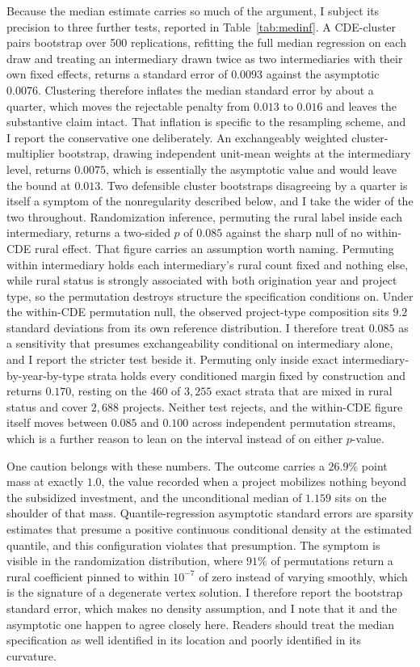 Because the median estimate carries so much of the argument, I subject its
precision to three further tests, reported in
Table~\ref{tab:medinf}. A CDE-cluster pairs bootstrap over 500
replications, refitting the full median regression on each draw and
treating an intermediary drawn twice as two intermediaries with their own
fixed effects, returns a standard error of $0.0093$ against the asymptotic
$0.0076$. Clustering therefore inflates the median standard error by about
a quarter, which moves the rejectable penalty from $0.013$ to $0.016$ and
leaves the substantive claim intact. That inflation is specific to the
resampling scheme, and I report the conservative one deliberately. An
exchangeably weighted cluster-multiplier bootstrap, drawing independent
unit-mean weights at the intermediary level, returns $0.0075$, which is
essentially the asymptotic value and would leave the bound at $0.013$. Two
defensible cluster bootstraps disagreeing by a quarter is itself a symptom
of the nonregularity described below, and I take the wider of the two
throughout. Randomization inference, permuting the
rural label inside each intermediary, returns a two-sided $p$ of $0.085$
against the sharp null of no within-CDE rural effect. That figure carries
an assumption worth naming. Permuting within intermediary holds each
intermediary's rural count fixed and nothing else, while rural status is
strongly associated with both origination year and project type, so the
permutation destroys structure the specification conditions on. Under the
within-CDE permutation null, the observed project-type composition sits
$9.2$ standard deviations from its own reference distribution. I therefore
treat $0.085$ as a sensitivity that presumes exchangeability conditional on
intermediary alone, and I report the stricter test beside it. Permuting
only inside exact intermediary-by-year-by-type strata holds every
conditioned margin fixed by construction and returns $0.170$, resting on
the $460$ of $3{,}255$ exact strata that are mixed in rural status and
cover $2{,}688$ projects. Neither test rejects, and the within-CDE figure
itself moves between $0.085$ and $0.100$ across independent permutation
streams, which is a further reason to lean on the interval instead of on
either $p$-value.

One caution belongs with these numbers. The outcome carries a $26.9\%$
point mass at exactly $1.0$, the value recorded when a project mobilizes
nothing beyond the subsidized investment, and the unconditional median of
$1.159$ sits on the shoulder of that mass. Quantile-regression asymptotic
standard errors are sparsity estimates that presume a positive continuous
conditional density at the estimated quantile, and this configuration
violates that presumption. The symptom is visible in the randomization
distribution, where $91\%$ of permutations return a rural coefficient
pinned to within $10^{-7}$ of zero instead of varying smoothly, which is
the signature of a degenerate vertex solution. I therefore report the
bootstrap standard error, which makes no density assumption, and I note
that it and the asymptotic one happen to agree closely here. Readers should
treat the median specification as well identified in its location and
poorly identified in its curvature.

